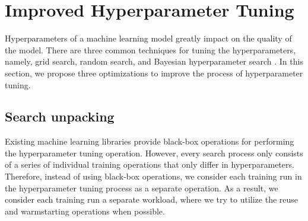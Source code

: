 \section{Improved Hyperparameter Tuning} \label{sec-hyperparam-optimization}
Hyperparameters of a machine learning model greatly impact on the quality of the model.
There are three common techniques for tuning the hyperparameters, namely, grid search, random search, and Bayesian hyperparameter search \cite{hutter2011sequential,snoek2012practical}.
In this section, we propose three optimizations to improve the process of hyperparameter tuning.

\subsection{Search unpacking}
Existing machine learning libraries provide black-box operations for performing the hyperparameter tuning operation.
However, every search process only consists of a series of individual training operations that only differ in hyperparameters.
Therefore, instead of using black-box operations, we consider each training run in the hyperparameter tuning process as a separate operation.
As a result, we consider each training run a separate workload, where we try to utilize the reuse and warmstarting operations when possible.

